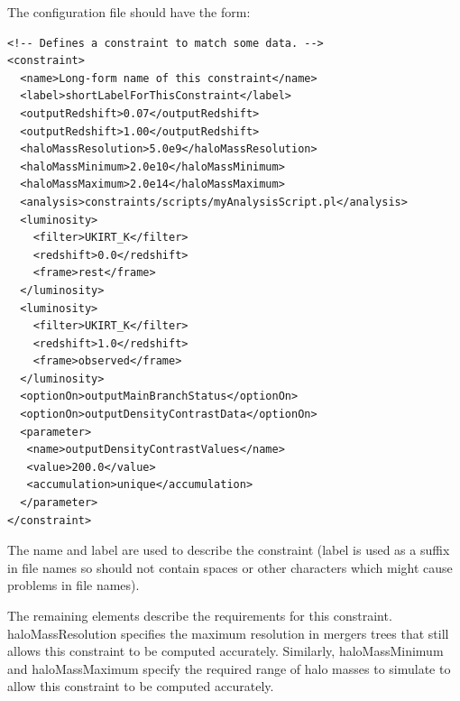 The configuration file should have the form:
\begin{verbatim}
<!-- Defines a constraint to match some data. -->                                          
<constraint>                                                                                                         
  <name>Long-form name of this constraint</name>                                                                      
  <label>shortLabelForThisConstraint</label>                                                                        
  <outputRedshift>0.07</outputRedshift>                                                                              
  <outputRedshift>1.00</outputRedshift>                                                                              
  <haloMassResolution>5.0e9</haloMassResolution>                                                                     
  <haloMassMinimum>2.0e10</haloMassMinimum>                                                                          
  <haloMassMaximum>2.0e14</haloMassMaximum>                                                                          
  <analysis>constraints/scripts/myAnalysisScript.pl</analysis>                                         
  <luminosity>
    <filter>UKIRT_K</filter>
    <redshift>0.0</redshift>
    <frame>rest</frame>
  </luminosity>
  <luminosity>
    <filter>UKIRT_K</filter>
    <redshift>1.0</redshift>
    <frame>observed</frame>
  </luminosity>
  <optionOn>outputMainBranchStatus</optionOn>
  <optionOn>outputDensityContrastData</optionOn>
  <parameter>
   <name>outputDensityContrastValues</name>
   <value>200.0</value>
   <accumulation>unique</accumulation>
  </parameter>
</constraint>                                                                                                        
\end{verbatim}
The {\normalfont \ttfamily name} and {\normalfont \ttfamily label} are used to describe the constraint ({\normalfont \ttfamily label} is used as a suffix in file names so should not contain spaces or other characters which might cause problems in file names). 

The remaining elements describe the requirements for this constraint. {\normalfont \ttfamily haloMassResolution} specifies the maximum resolution in mergers trees that still allows this constraint to be computed accurately. Similarly, {\normalfont \ttfamily haloMassMinimum} and {\normalfont \ttfamily haloMassMaximum} specify the required range of halo masses to simulate to allow this constraint to be computed accurately.

